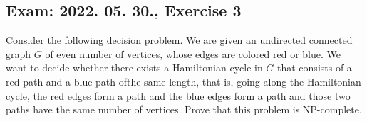 \subsection{Exam: 2022. 05. 30., Exercise 3}


Consider the following decision problem. We are given an undirected connected
graph $G$ of even number of vertices, whose edges are colored red or blue.
We want to decide whether there exists a Hamiltonian cycle in $G$ that consists
of a red path and a blue path ofthe same length, that is, going along the
Hamiltonian cycle, the red edges form a path and the blue edges form a path
and those two paths have the same number of vertices. Prove that this problem
is NP-complete.



